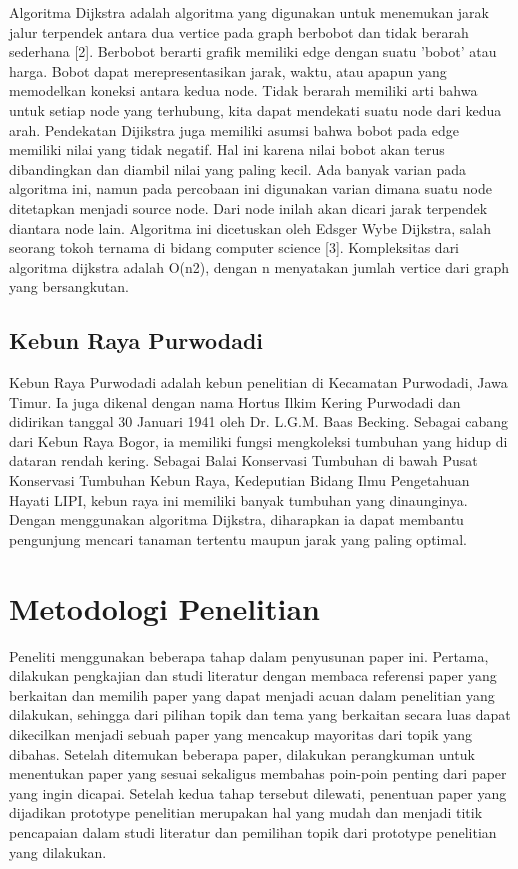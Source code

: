 \documentclass[conference]{IEEEtran}
\begin{document}
Algoritma Dijkstra adalah algoritma yang digunakan untuk
menemukan jarak jalur terpendek antara dua vertice pada
graph berbobot dan tidak berarah sederhana [2]. Berbobot
berarti grafik memiliki edge dengan suatu ’bobot’ atau harga.
Bobot dapat merepresentasikan jarak, waktu, atau apapun
yang memodelkan koneksi antara kedua node. Tidak berarah
memiliki arti bahwa untuk setiap node yang terhubung, kita
dapat mendekati suatu node dari kedua arah. Pendekatan Dijikstra
juga memiliki asumsi bahwa bobot pada edge memiliki
nilai yang tidak negatif. Hal ini karena nilai bobot akan
terus dibandingkan dan diambil nilai yang paling kecil. Ada
banyak varian pada algoritma ini, namun pada percobaan
ini digunakan varian dimana suatu node ditetapkan menjadi
source node. Dari node inilah akan dicari jarak terpendek
diantara node lain. Algoritma ini dicetuskan oleh Edsger
Wybe Dijkstra, salah seorang tokoh ternama di bidang computer
science [3]. Kompleksitas dari algoritma dijkstra adalah
O(n2), dengan n menyatakan jumlah vertice dari graph yang
bersangkutan.

\subsection{Kebun Raya Purwodadi}
Kebun Raya Purwodadi adalah kebun penelitian di Kecamatan
Purwodadi, Jawa Timur. Ia juga dikenal dengan nama
Hortus Ilkim Kering Purwodadi dan didirikan tanggal 30 Januari
1941 oleh Dr. L.G.M. Baas Becking. Sebagai cabang dari
Kebun Raya Bogor, ia memiliki fungsi mengkoleksi tumbuhan
yang hidup di dataran rendah kering. Sebagai Balai Konservasi
Tumbuhan di bawah Pusat Konservasi Tumbuhan Kebun Raya,
Kedeputian Bidang Ilmu Pengetahuan Hayati LIPI, kebun raya
ini memiliki banyak tumbuhan yang dinaunginya. Dengan
menggunakan algoritma Dijkstra, diharapkan ia dapat membantu
pengunjung mencari tanaman tertentu maupun jarak
yang paling optimal.

\section{Metodologi Penelitian}
Peneliti menggunakan beberapa tahap dalam penyusunan
paper ini. Pertama, dilakukan pengkajian dan studi literatur
dengan membaca referensi paper yang berkaitan dan memilih
paper yang dapat menjadi acuan dalam penelitian yang dilakukan,
sehingga dari pilihan topik dan tema yang berkaitan
secara luas dapat dikecilkan menjadi sebuah paper yang mencakup
mayoritas dari topik yang dibahas. Setelah ditemukan
beberapa paper, dilakukan perangkuman untuk menentukan
paper yang sesuai sekaligus membahas poin-poin penting
dari paper yang ingin dicapai. Setelah kedua tahap tersebut
dilewati, penentuan paper yang dijadikan prototype penelitian
merupakan hal yang mudah dan menjadi titik pencapaian
dalam studi literatur dan pemilihan topik dari prototype penelitian
yang dilakukan.
\end{document}

